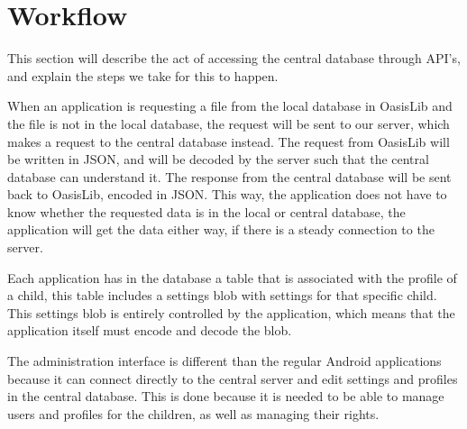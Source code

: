 \section{Workflow}
This section will describe the act of accessing the central database through API's, and explain the steps we take for this to happen.

When an application is requesting a file from the local database in OasisLib and the file is not in the local database, the request will be sent to our server, which makes a request to the central database instead. The request from OasisLib will be written in JSON, and will be decoded by the server such that the central database can understand it. The response from the central database will be sent back to OasisLib, encoded in JSON. This way, the application does not have to know whether the requested data is in the local or central database, the application will get the data either way, if there is a steady connection to the server.

Each application has in the database a table that is associated with the profile of a child, this table includes a settings blob with settings for that specific child. This settings blob is entirely controlled by the application, which means that the application itself must encode and decode the blob.

The administration interface is different than the regular Android applications because it can connect directly to the central server and edit settings and profiles in the central database. This is done because it is needed to be able to manage users and profiles for the children, as well as managing their rights.